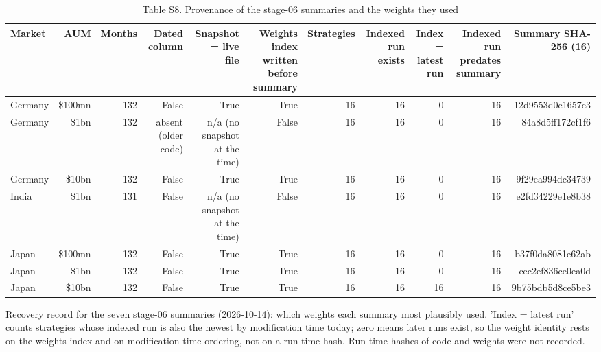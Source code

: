 \begin{table}[t]
\centering
\small
\caption{Table S8. Provenance of the stage-06 summaries and the weights they used}
\label{tab:s8}
\begin{tabular}{lrrrrrrrrrr}
\toprule
Market & AUM & Months & Dated column & Snapshot = live file & Weights index written before summary & Strategies & Indexed run exists & Index = latest run & Indexed run predates summary & Summary SHA-256 (16) \\
\midrule
Germany & \$100mn & 132 & False & True & True & 16 & 16 & 0 & 16 & 12d9553d0e1657c3 \\
Germany & \$1bn & 132 & absent (older code) & n/a (no snapshot at the time) & False & 16 & 16 & 0 & 16 & 84a8d5ff172cf1f6 \\
Germany & \$10bn & 132 & False & True & True & 16 & 16 & 0 & 16 & 9f29ea994dc34739 \\
India & \$1bn & 131 & False & n/a (no snapshot at the time) & False & 16 & 16 & 0 & 16 & e2fd34229e1e8b38 \\
Japan & \$100mn & 132 & False & True & True & 16 & 16 & 0 & 16 & b37f0da8081e62ab \\
Japan & \$1bn & 132 & False & True & True & 16 & 16 & 0 & 16 & cec2ef836ce0ea0d \\
Japan & \$10bn & 132 & False & True & True & 16 & 16 & 16 & 16 & 9b75bdb5d8ce5be3 \\
\bottomrule
\end{tabular}
\par\vspace{2pt}
\parbox{\textwidth}{\footnotesize Recovery record for the seven stage-06 summaries (2026-10-14): which weights each summary most plausibly used. 'Index = latest run' counts strategies whose indexed run is also the newest by modification time today; zero means later runs exist, so the weight identity rests on the weights index and on modification-time ordering, not on a run-time hash. Run-time hashes of code and weights were not recorded.}
\end{table}
